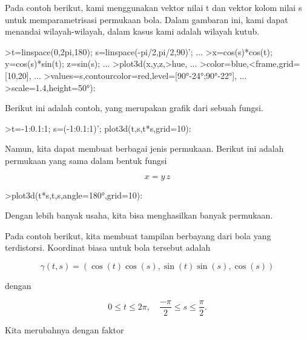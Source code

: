 \documentclass[a4paper,10pt]{article}
\begin{document}
\begin{eulernotebook}
\begin{eulercomment}
\begin{eulercomment}
\begin{eulercomment}
Pada contoh berikut, kami menggunakan vektor nilai t dan vektor kolom
nilai s untuk memparametrisasi permukaan bola. Dalam gambaran ini,
kami dapat menandai wilayah-wilayah, dalam kasus kami adalah wilayah
kutub.
\end{eulercomment}
\begin{eulerprompt}
>t=linspace(0,2pi,180); s=linspace(-pi/2,pi/2,90)'; ...
>x=cos(s)*cos(t); y=cos(s)*sin(t); z=sin(s); ...
>plot3d(x,y,z,>hue, ...
>color=blue,<frame,grid=[10,20], ...
>values=s,contourcolor=red,level=[90°-24°;90°-22°], ...
>scale=1.4,height=50°):
\end{eulerprompt}
\begin{eulercomment}
Berikut ini adalah contoh, yang merupakan grafik dari sebuah fungsi.
\end{eulercomment}
\begin{eulerprompt}
>t=-1:0.1:1; s=(-1:0.1:1)'; plot3d(t,s,t*s,grid=10):
\end{eulerprompt}
\begin{eulercomment}
Namun, kita dapat membuat berbagai jenis permukaan. Berikut ini adalah
permukaan yang sama dalam bentuk fungsi

\end{eulercomment}
\begin{eulerformula}
\[
x = y \, z
\]
\end{eulerformula}
\begin{eulerprompt}
>plot3d(t*s,t,s,angle=180°,grid=10):
\end{eulerprompt}
\begin{eulercomment}
Dengan lebih banyak usaha, kita bisa menghasilkan banyak permukaan.

Pada contoh berikut, kita membuat tampilan berbayang dari bola yang
terdistorsi. Koordinat biasa untuk bola tersebut adalah

\end{eulercomment}
\begin{eulerformula}
\[
\gamma(t,s) = (\cos(t)\cos(s),\sin(t)\sin(s),\cos(s))
\]
\end{eulerformula}
\begin{eulercomment}
dengan

\end{eulercomment}
\begin{eulerformula}
\[
0 \le t \le 2\pi, \quad \frac{-\pi}{2} \le s \le \frac{\pi}{2}.
\]
\end{eulerformula}
\begin{eulercomment}
Kita merubahnya dengan faktor


\end{eulercomment}
\end{eulercomment}
\end{eulercomment}
\end{eulernotebook}
\end{document}
